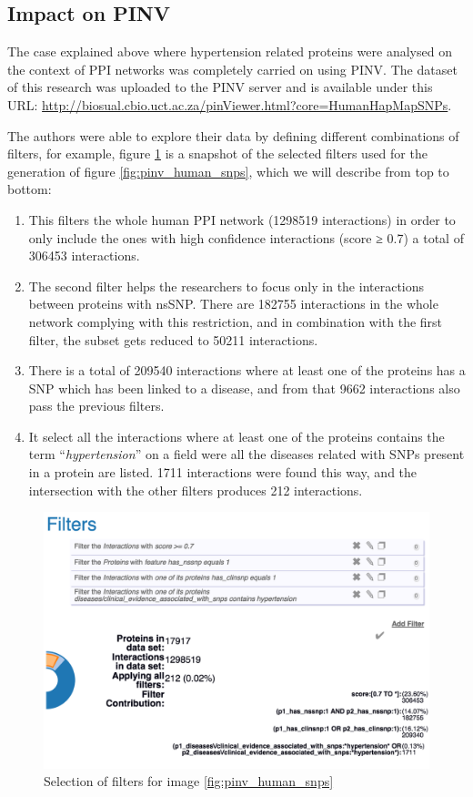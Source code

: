 \subsection{Impact on PINV}
The case explained above where hypertension related proteins were analysed on the context of PPI networks was completely carried on using PINV. The dataset of this research was uploaded to the PINV server and is available under this URL: \url{http://biosual.cbio.uct.ac.za/pinViewer.html?core=HumanHapMapSNPs}. 

The authors were able to explore their data by defining different combinations of filters, for example, figure \ref{fig:pinv_prefilters_snp} is a snapshot of the selected filters used for the generation of figure \ref{fig:pinv_human_snps}, which we will describe from top to bottom: 
\begin{enumerate}
\setlength\itemsep{-0.5em}
\item This filters the whole human PPI network (1298519 interactions) in order to only include the ones with high confidence interactions (score ≥ 0.7) a total of 306453 interactions.
\item The second filter helps the researchers to focus only in the interactions between proteins with nsSNP. There are 182755 interactions in the whole network complying with this restriction, and in combination with the first filter, the subset gets reduced to 50211 interactions.
\item There is a total of 209540 interactions where at least one of the proteins has a SNP which has been linked to a disease, and from that 9662 interactions also pass the previous filters.
\item It select all the interactions where at least one of the proteins contains the term ``\emph{hypertension}'' on a field were all the diseases related with SNPs present in a protein are listed. 1711 interactions were found this way, and the intersection with the other filters produces 212 interactions.
\end{enumerate}
\begin{figure}
\centering
\includegraphics[width=5in]{figures/pinv_prefilters_snp.png}
\caption[Selection of filters for image \ref{fig:pinv_human_snps}]{Selection of filters for image \ref{fig:pinv_human_snps}
\label{fig:pinv_prefilters_snp}}
\end{figure}

